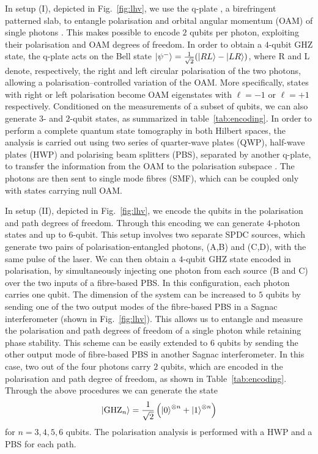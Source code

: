 \documentclass[aps,superscriptaddress,nofootinbib,twocolumn]{revtex4-1}
\begin{document}
In setup (I), depicted in Fig.~\ref{fig:lhv}, we use the q-plate \cite{piccirillo2010photon}, a
birefringent patterned slab, to entangle polarisation and orbital
angular momentum (OAM) of single photons \cite{marrucci2006optical, VVbeam, marrucci_stoam_2011, nagali2009quantum}. This makes possible to encode $2$ qubits per photon, exploiting their polarisation and OAM degrees of freedom. 
In order to obtain a $4$-qubit GHZ state, the q-plate acts on the Bell state $\ket{\psi^{-}}=\frac{1}{\sqrt{2}}(\ket{RL}-\ket{LR})$,
where R and L denote, respectively, the right and left circular polarisation of the two photons, allowing
a polarisation--controlled variation of
the OAM. More specifically, states with right or left polarisation become
OAM eigenstates with $\ell = -1$ or $\ell = +1$ respectively.
Conditioned on the measurements of a subset of qubits, we can also generate $3$- and $2$-qubit states, as summarized in table~\ref{tab:encoding}.
In order to perform a complete quantum state tomography in both Hilbert spaces,
the analysis is carried out using two series of quarter-wave plates (QWP), half-wave plates (HWP) and polarising beam
splitters (PBS), separated by another q-plate, to transfer the information
from the OAM to the polarisation
subspace \cite{nagali2009quantum}. The photons are then sent to single mode fibres (SMF), which can be coupled only with states carrying null OAM.

In setup (II), depicted in Fig.~\ref{fig:lhv}, we encode the qubits in the polarisation and path degrees of freedom. Through this encoding we can generate $4$-photon states and up to $6$-qubit.
This setup involves two separate SPDC sources, which generate
two pairs of polarisation-entangled photons, (A,B) and (C,D), with the same pulse of the laser.
We can then obtain a $4$-qubit GHZ state encoded in polarisation, by simultaneously injecting one photon from each source (B and C) over the two inputs of a fibre-based PBS. In this configuration, each photon carries one qubit.
The dimension of the system can be increased to $5$ qubits by sending one of the two output modes of the fibre-based PBS in a Sagnac interferometer (shown in Fig.~\ref{fig:lhv}). This allows us to entangle and measure the polarisation and path degrees of freedom of a single photon while retaining phase stability.
This scheme can be easily extended to $6$ qubits by sending the other output mode of fibre-based PBS in another Sagnac interferometer. In this case, two out of the four photons carry $2$ qubits, which are encoded in the polarisation and path degree of freedom, as shown in Table~\ref{tab:encoding}. 
Through the above procedures we can generate the state
\begin{equation} \label{eq:GHZ6q}
    \ket{\mathrm{GHZ}_n} = \frac{1}{\sqrt{2}}\left(\ket{0}^{\otimes n} + \ket{1}^{\otimes n}\right) 
\end{equation}
for $n = {3, 4, 5, 6}$ qubits.
The polarisation analysis is performed with a HWP and a PBS for each path.\\
\end{document}
